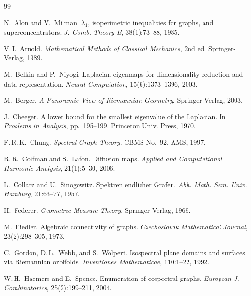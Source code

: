 \documentclass[12pt,letterpaper]{article}
\begin{document}
\begin{thebibliography}{99}

N.~Alon and V.~Milman.
\newblock $\lambda_1$, isoperimetric inequalities for graphs, and superconcentrators.
\newblock \emph{J. Comb. Theory B}, 38(1):73--88, 1985.

V.\,I.~Arnold.
\newblock \emph{Mathematical Methods of Classical Mechanics}, 2nd ed.
\newblock Springer-Verlag, 1989.

M.~Belkin and P.~Niyogi.
\newblock Laplacian eigenmaps for dimensionality reduction and data representation.
\newblock \emph{Neural Computation}, 15(6):1373--1396, 2003.

M.~Berger.
\newblock \emph{A Panoramic View of Riemannian Geometry}.
\newblock Springer-Verlag, 2003.

J.~Cheeger.
\newblock A lower bound for the smallest eigenvalue of the Laplacian.
\newblock In \emph{Problems in Analysis}, pp.~195--199. Princeton Univ. Press, 1970.

F.\,R.\,K.~Chung.
\newblock \emph{Spectral Graph Theory}.
\newblock CBMS No.~92, AMS, 1997.

R.\,R.~Coifman and S.~Lafon.
\newblock Diffusion maps.
\newblock \emph{Applied and Computational Harmonic Analysis}, 21(1):5--30, 2006.

L.~Collatz and U.~Sinogowitz.
\newblock Spektren endlicher Grafen.
\newblock \emph{Abh. Math. Sem. Univ. Hamburg}, 21:63--77, 1957.

H.~Federer.
\newblock \emph{Geometric Measure Theory}.
\newblock Springer-Verlag, 1969.

M.~Fiedler.
\newblock Algebraic connectivity of graphs.
\newblock \emph{Czechoslovak Mathematical Journal}, 23(2):298--305, 1973.

C.~Gordon, D.\,L.~Webb, and S.~Wolpert.
\newblock Isospectral plane domains and surfaces via Riemannian orbifolds.
\newblock \emph{Inventiones Mathematicae}, 110:1--22, 1992.

W.\,H.~Haemers and E.~Spence.
\newblock Enumeration of cospectral graphs.
\newblock \emph{European J. Combinatorics}, 25(2):199--211, 2004.


\end{thebibliography}
\end{document}
